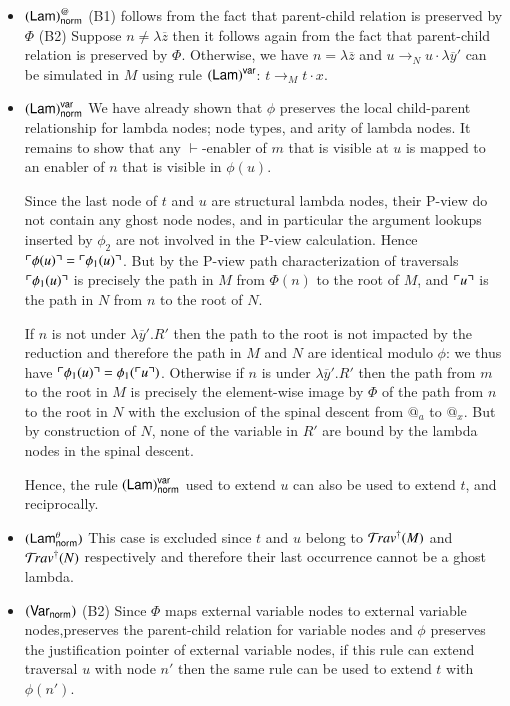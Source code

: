 \documentclass{elsarticle}
\theoremstyle{plain}
\theoremstyle{definition}
\newcommand{\ghostvar}{\theta}
\newcommand{\normalizing}{{\sf norm}}
\newcommand{\enables}{\vdash} %
\begin{document}
\begin{description}[itemindent=0em,leftmargin=0cm]
\begin{itemize}[itemindent=0.5em, leftmargin=0.5em]
    \item $\rulename{Lam}^@_\normalizing$
    (B1) follows from the fact that parent-child relation is preserved by $\Phi$
    (B2) Suppose $n \neq \lambda\overline{z}$ then it follows again from the fact that parent-child relation is preserved by $\Phi$.
    Otherwise, we have $n = \lambda\overline{z}$ and $u \rightarrow_N u \cdot \lambda\overline{y}'$ can be simulated in $M$ using rule $\mathbf{({\sf Lam})}^{\sf var}$: $t \rightarrow_M t \cdot x$.

    \item $\rulename{Lam}^{\sf var}_\normalizing$
    We have already shown that  $\phi$ preserves the local child-parent relationship for lambda nodes; node types, and arity of lambda nodes.
    It remains to show that any $\enables$-enabler of $m$ that is visible at  $u$ is mapped to an enabler of $n$ that is visible in $\phi(u)$.

    Since the last node of $t$ and $u$ are structural lambda nodes, their P-view do not contain any ghost node nodes, and in particular the argument lookups inserted by $\phi_2$ are not involved in the P-view calculation. Hence $\ulcorner \phi(u) \urcorner = \ulcorner \phi_1(u) \urcorner$.
    But by the P-view path characterization of traversals $\ulcorner \phi_1(u) \urcorner$ is precisely the path in $M$ from $\Phi(n)$ to the root of $M$,
    and $\ulcorner u \urcorner$ is the path in $N$ from $n$ to the root of $N$.

    If $n$ is not under $\lambda\overline{y}'.R'$ then the path to the root is not impacted by the reduction and therefore the path in $M$ and $N$ are identical modulo $\phi$: we thus have $\ulcorner \phi_1(u) \urcorner = \phi_1(\ulcorner u \urcorner)$.
    Otherwise if $n$ is under $\lambda\overline{y}'.R'$ then the path from $m$ to the root in $M$ is precisely the element-wise image by $\Phi$ of the path from $n$ to the root in $N$ with the exclusion of the spinal descent from $@_a$ to $@_x$. But by construction of $N$, none of the variable in $R'$ are bound by the lambda nodes in the spinal descent.

    Hence, the rule $\rulename{Lam}^{\sf var}_\normalizing$ used to extend  $u$ can also be used to extend $t$, and reciprocally.

    \item $\rulename{Lam^\ghostvar_\normalizing}$
    This case is excluded since $t$ and $u$ belong to $\mathcal{T}\!rav^\dagger(M)$ and
    $\mathcal{T}\!rav^\dagger(N)$ respectively and therefore their last occurrence cannot be a ghost lambda.

    \item $\rulename{Var_\normalizing}$
    (B2) Since $\Phi$ maps external variable nodes to external variable nodes,preserves the parent-child relation for variable nodes and $\phi$ preserves the justification pointer of external variable nodes, if this rule can extend traversal $u$ with node $n'$ then the same rule can be used to extend $t$ with $\phi(n')$.


\end{itemize}
\end{description}
\end{document}
